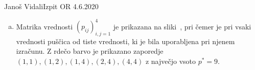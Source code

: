 \begin{naloga}{Janoš Vidali}{Izpit OR 4.6.2020}
\begin{odgovor}
\begin{enumerate}[(a)]
\item Matrika vrednosti $(p_{ij})_{i,j=1}^4$
je prikazana na sliki~,
pri čemer je pri vsaki vred\-no\-sti puščica od tiste vrednosti,
ki je bila uporabljena pri njenem izračunu.
Z rdečo barvo je prikazano zaporedje
$(1, 1), (1, 2), (1, 4), (2, 4), (4, 4)$
z največjo vsoto $p^* = 9$.
\end{enumerate}

\begin{slika}
\end{slika}
\end{odgovor}
\end{naloga}
